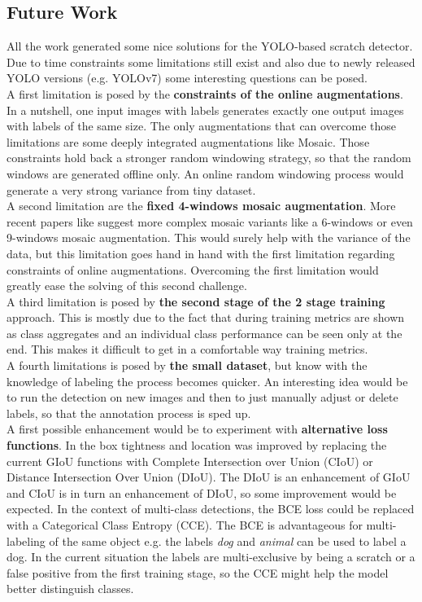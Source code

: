 \subsection*{Future Work}
All the work generated some nice solutions for the YOLO-based scratch detector. Due to time constraints some limitations still exist and also due to newly released YOLO versions (e.g. YOLOv7) some interesting questions can be posed. \\
A first limitation is posed by the \textbf{constraints of the online augmentations}. In a nutshell, one input images with labels generates exactly one output images with labels of the same size. The only augmentations that can overcome those limitations are some deeply integrated augmentations like Mosaic. Those constraints hold back a stronger random windowing strategy, so that the random windows are generated offline only. An online random windowing process would generate a very strong variance from tiny dataset. \\
A second limitation are the \textbf{fixed 4-windows mosaic augmentation}. More recent papers like \cite{yolo_smoke_paper, improved_mosaic_paper} suggest more complex mosaic variants like a 6-windows or even 9-windows mosaic augmentation. This would surely help with the variance of the data, but this limitation goes hand in hand with the first limitation regarding constraints of online augmentations. Overcoming the first limitation would greatly ease the solving of this second challenge. \\
A third limitation is posed by \textbf{the second stage of the 2 stage training} approach. This is mostly due to the fact that during training metrics are shown as class aggregates and an individual class performance can be seen only at the end. This makes it difficult to get in a comfortable way training metrics. \\
A fourth limitations is posed by \textbf{the small dataset}, but know with the knowledge of labeling the process becomes quicker. An interesting idea would be to run the detection on new images and then to just manually adjust or delete labels, so that the annotation process is sped up. \\
A first possible enhancement would be to experiment with \textbf{alternative loss functions}. In \cite{yolo_smoke_paper} the box tightness and location was improved by replacing the current GIoU functions with Complete Intersection over Union (CIoU) or Distance Intersection Over Union (DIoU). The DIoU is an enhancement of GIoU and CIoU is in turn an enhancement of DIoU, so some improvement would be expected. In the context of multi-class detections, the BCE loss could be replaced with a Categorical Class Entropy (CCE). The BCE is advantageous for multi-labeling of the same object e.g. the labels \textit{dog} and \textit{animal} can be used to label a dog. In the current situation the labels are multi-exclusive by being a scratch or a false positive from the first training stage, so the CCE might help the model better distinguish classes. \\
